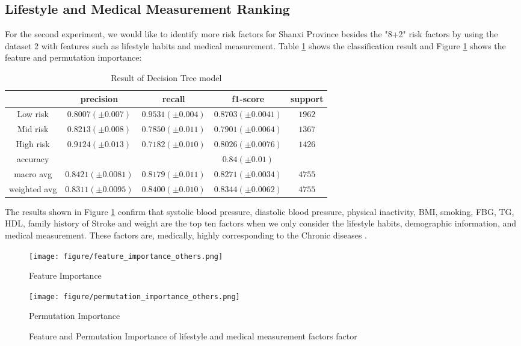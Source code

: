 \documentclass{article}
\begin{document}
\subsection{Lifestyle and Medical Measurement Ranking}
For the second experiment, we would like to identify  
more risk factors for Shanxi Province besides the "8+2" risk factors by using the dataset 2 with features such as lifestyle habits and medical measurement.
Table \ref{table:RF-lf-mm-factors} shows the classification result and Figure \ref{fig:feature_permutation_10_factor_life_med} shows the feature and permutation importance:
\begin{table}[H]
\small
\centering
\begin{tabular}{ccccc}
\hline
\textbf{}    & \textbf{precision} & \textbf{recall} & \textbf{f1-score} & \textbf{support} \\ \hline
Low risk     & $0.8007(\pm 0.007)$             & $0.9531(\pm 0.004)$          & $0.8703(\pm 0.0041)$            & $1962$           \\
Mid risk     & $0.8213(\pm 0.008)$             & $0.7850(\pm 0.011)$          & $0.7901(\pm 0.0064)$               & $1367$           \\
High risk    & $0.9124(\pm 0.013)$             & $0.7182(\pm 0.010)$          & $0.8026(\pm 0.0076)$         & $1426$           \\
accuracy     &                    &                 & $0.84 (\pm 0.01)$            &                  \\
macro avg    & $0.8421(\pm 0.0081)$             & $0.8179(\pm 0.011)$          & $0.8271(\pm 0.0034)$            & $4755$           \\
weighted avg & $0.8311(\pm 0.0095)$             & $0.8400(\pm 0.010)$          & $0.8344(\pm 0.0062)$            & $4755$           \\ \hline
\end{tabular}
\caption{Result of Decision Tree model} \label{table:RF-lf-mm-factors}
\end{table}

 The results shown in Figure \ref{fig:feature_permutation_10_factor_life_med} confirm  that systolic blood pressure, diastolic blood pressure, physical inactivity, BMI, smoking, FBG, TG, HDL, family history of Stroke and weight are the top ten factors when we only consider the lifestyle habits, demographic information, and medical measurement. These factors are, medically, highly corresponding to the Chronic diseases \cite{levy2009genome, decode2001glucose, wu2007cut}.  
\begin{figure}[H]
\centering
\begin{minipage}[t]{0.48\textwidth}
\centering
\texttt{[image: figure/feature\_importance\_others.png]}
\caption{Feature Importance}
\end{minipage}
\begin{minipage}[t]{0.48\textwidth}
\centering
\texttt{[image: figure/permutation\_importance\_others.png]}
\caption{Permutation Importance}
\end{minipage}
\caption{Feature and Permutation Importance of lifestyle and medical measurement factors factor}
\label{fig:feature_permutation_10_factor_life_med}
\end{figure}
\end{document}
